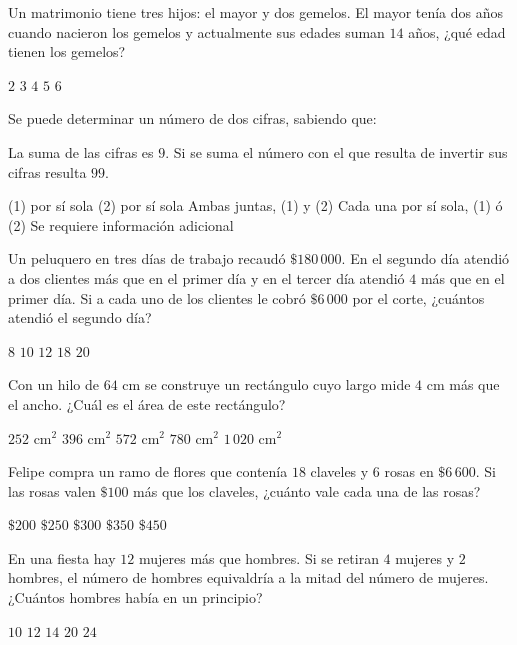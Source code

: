 \documentclass[sin nombre]{srs}
\begin{document}
\begin{preguntas}[after-item-skip=2cm]
\pregunta Un matrimonio tiene tres hijos: el mayor y dos gemelos. El mayor tenía dos años cuando nacieron los gemelos y actualmente sus edades suman $14$ años, ¿qué edad tienen los gemelos?
\begin{vertical}
\alternativa $2$
\alternativa $3$
\alternativa $4$
\alternativa $5$
\alternativa $6$
\end{vertical}

\pregunta Se puede determinar un número de dos cifras, sabiendo que:
\begin{verticaln}
\alternativa La suma de las cifras es $9$.
\alternativa Si se suma el número con el que resulta de invertir sus cifras resulta $99$.
\end{verticaln}
\begin{vertical}
\alternativa (1) por sí sola
\alternativa (2) por sí sola
\alternativa Ambas juntas, (1) y (2)
\alternativa Cada una por sí sola, (1) ó (2)
\alternativa Se requiere información adicional
\end{vertical}

\pregunta Un peluquero en tres días de trabajo recaudó $\$180\,000$. En el segundo día atendió a dos clientes más que en el primer día y en el tercer día atendió $4$ más que en el primer día. Si a cada uno de los clientes le cobró $\$6\,000$ por el corte, ¿cuántos atendió el segundo día?
\begin{vertical}
\alternativa $8$
\alternativa $10$
\alternativa $12$
\alternativa $18$
\alternativa $20$
\end{vertical}

\pregunta Con un hilo de $64 \text{ cm}$ se construye un rectángulo cuyo largo mide $4 \text{ cm}$ más que el ancho. ¿Cuál es el área de este rectángulo?
\begin{vertical}
\alternativa $252 \text{ cm}^2$
\alternativa $396 \text{ cm}^2$
\alternativa $572 \text{ cm}^2$
\alternativa $780 \text{ cm}^2$
\alternativa $1\,020 \text{ cm}^2$
\end{vertical}

\pregunta Felipe compra un ramo de flores que contenía $18$ claveles y $6$ rosas en $\$6\,600$. Si las rosas valen $\$100$ más que los claveles, ¿cuánto vale cada una de las rosas?
\begin{vertical}
\alternativa $\$200$
\alternativa $\$250$
\alternativa $\$300$
\alternativa $\$350$
\alternativa $\$450$
\end{vertical}

\pregunta En una fiesta hay $12$ mujeres más que hombres. Si se retiran $4$ mujeres y $2$ hombres, el número de hombres equivaldría a la mitad del número de mujeres. ¿Cuántos hombres había en un principio?
\begin{vertical}
\alternativa $10$
\alternativa $12$
\alternativa $14$
\alternativa $20$
\alternativa $24$
\end{vertical}


\end{preguntas}
\end{document}
